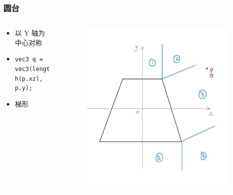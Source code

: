 \documentclass[aspectratio=169]{ctexbeamer} %
\begin{document}
\begin{frame}
    \frametitle{圆台} %
    \begin{columns}
        \begin{column}{.6\textwidth}
            \begin{itemize}[<+->]
                \item 以 Y 轴为中心对称
                \item \texttt{vec3 q = vec3(length(p.xz), p.y);}
                \item 梯形
            \end{itemize}
        \end{column}
        \begin{column}{.4\textwidth}
            \begin{figure}[htbp]
                \centering
                \includegraphics[height=.65\textheight]{images/pre/cone_derive.pdf}
                \caption{}
                \label{fig:cone_derive}
            \end{figure}
        \end{column}
    \end{columns}
\end{frame}
\end{document}
